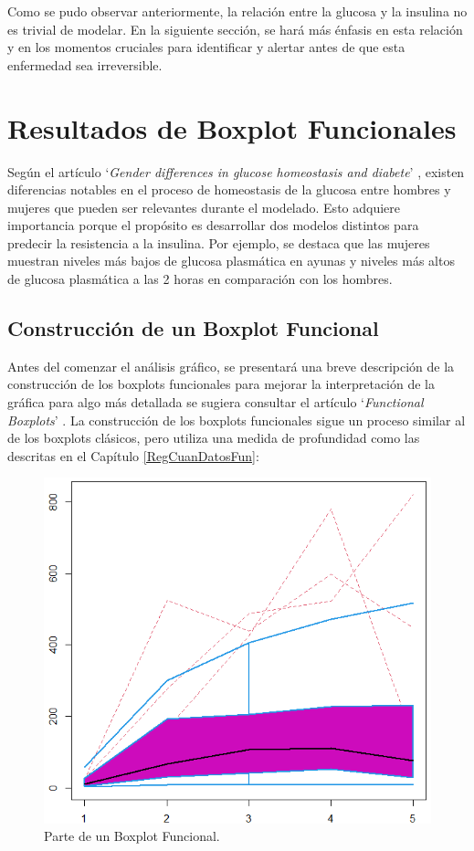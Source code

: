 Como se pudo observar anteriormente, la relación entre la glucosa y la insulina no es trivial de modelar. En la siguiente sección, se hará más énfasis en esta relación y en los momentos cruciales para identificar y alertar antes de que esta enfermedad sea irreversible.


\section{Resultados de Boxplot Funcionales}

Según el artículo `\textit{Gender differences in glucose homeostasis and diabete}' \cite{GenderDifferences2018}, existen diferencias notables en el proceso de homeostasis de la glucosa entre hombres y mujeres que pueden ser relevantes durante el modelado. Esto adquiere importancia porque el propósito es desarrollar dos modelos distintos para predecir la resistencia a la insulina. Por ejemplo, se destaca que las mujeres muestran niveles más bajos de glucosa plasmática en ayunas y niveles más altos de glucosa plasmática a las 2 horas en comparación con los hombres.

\subsection{Construcción de un Boxplot Funcional}

Antes del comenzar el análisis gráfico, se presentará una breve descripción de la construcción de los boxplots funcionales para mejorar la interpretación de la gráfica para algo más detallada se sugiera consultar el artículo `\textit{Functional Boxplots}' \cite{boxplotFun}. La construcción de los boxplots funcionales sigue un proceso similar al de los boxplots clásicos, pero utiliza una medida de profundidad como las descritas en el Capítulo \ref{RegCuanDatosFun}:

\begin{figure}[H]
    \centering
    \includegraphics[width=0.5\linewidth]{Imagenes/partes.png}
    \caption{Parte de un Boxplot Funcional.}
    \label{fig:bfpartes}
\end{figure}

